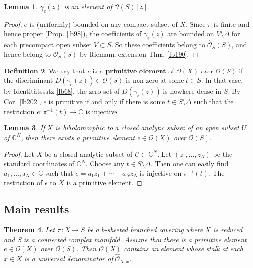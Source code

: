 \documentclass[12pt,b5paper,notitlepage]{report}
\theoremstyle{definition}
\newtheorem{df}{Definition}[section]
\theoremstyle{plain}
\newtheorem{thm}[df]{Theorem}
\newtheorem{lm}[df]{Lemma}
\newcommand{\scr}{\mathscr}
\newcommand{\Cbb}{\mathbb C}
\newcommand{\Owht}{\widehat{\scr O}}
\numberwithin{equation}{section}
\begin{document}
\begin{lm}
$\gamma_e(z)$ is an element of $\scr O(S)[z]$.
\end{lm}

\begin{proof}
$e$ is (uniformly) bounded on any compact subset of $X$. Since $\pi$ is finite and hence proper (Prop. \ref{lb98}), the coefficients of $\gamma_e(z)$ are  bounded on $V\setminus\Delta$ for each precompact open subset $V\subset S$. So these coefficients belong to $\Owht_S(S)$, and hence belong to $\scr O_S(S)$ by Riemann extension Thm. \ref{lb190}.
\end{proof}

\begin{df}
We say that $e$ is a \textbf{primitive element}  of $\scr O(X)$ over $\scr O(S)$ if the discriminant $D(\gamma_e(z))\in\scr O(S)$ is non-zero at some $t\in S$. In that case, by Identit\"atssatz \ref{lb68}, the zero set of $D(\gamma_e(z))$ is nowhere dense in $S$. By Cor. \ref{lb202}, $e$ is primitive if and only if there is some $t\in S\setminus\Delta$ such that the restriction $e:\pi^{-1}(t)\rightarrow\Cbb$ is injective.
\end{df}

\begin{lm}\label{lb218}
If $X$ is biholomorphic to a closed analytic subset of an open subset $U$ of $\Cbb^N$, then there exists a primitive element $e\in\scr O(X)$ over $\scr O(S)$.
\end{lm}

\begin{proof}
Let $X$ be a closed analytic subset of $U\subset\Cbb^N$. Let $(z_1,\dots,z_N)$ be the standard coordinates of $\Cbb^N$. Choose any $t\in S\setminus\Delta$. Then one can easily find $a_1,\dots,a_N\in\Cbb$ such that $e=a_1z_1+\cdots+a_Nz_N$ is injective on $\pi^{-1}(t)$. The restriction of $e$ to $X$ is a primitive element.
\end{proof}


\subsection{Main results}


\begin{thm}\label{lb222}
Let $\pi:X\rightarrow S$ be a $b$-sheeted branched covering where $X$ is reduced and $S$ is a connected complex manifold. Assume that there is a primitive element $e\in\scr O(X)$ over $\scr O(S)$. Then $\scr O(X)$ contains an element whose stalk at each $x\in X$ is  a universal denominator of $\Owht_{X,x}$.
\end{thm}
\end{document}
